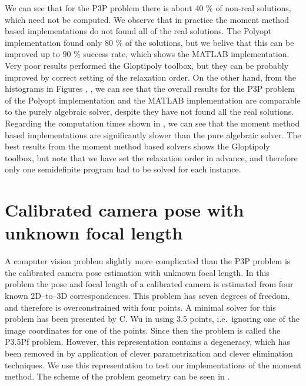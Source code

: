 We can see that for the P3P problem there is about $40$ \% of non-real solutions, which need not be computed.
We observe that in practice the moment method based implementations do not found all of the real solutions.
The Polyopt implementation found only $80$ \% of the solutions, but we belive that this can be improved up to $90$ \% success rate, which shows the MATLAB implementation.
Very poor results performed the Gloptipoly toolbox, but they can be probably improved by correct setting of the relaxation order.
On the other hand, from the histograms in Figures , ,  we can see that the overall results for the P3P problem of the Polyopt implementation and the MATLAB implementation are comparable to the purely algebraic solver, despite they have not found all the real solutions.
Regarding the computation times shown in , we can see that the moment method based implementations are significantly slower than the  pure algebraic solver.
The best results from the moment method based solvers shows the Gloptipoly \cite{gloptipoly} toolbox, but note that we have set the relaxation order in advance, and therefore only one semidefinite program had to be solved for each instance.

\section{Calibrated camera pose with unknown focal length}

A computer vision problem slightly more complicated than the P3P problem is the calibrated camera pose estimation with unknown focal length.
In this problem the pose and focal length of a calibrated camera is estimated from four known 2D--to--3D correspondences.
This problem has seven degrees of freedom, and therefore is overconstrained with four points.
A minimal solver for this problem has been presented by C. Wu in \cite{P35PfWu} using 3.5 points, i.e.\ ignoring one of the image coordinates for one of the points.
Since then the problem is called the P3.5Pf problem.
However, this representation contains a degeneracy, which has been removed in \cite{P35Pf} by application of clever parametrization and clever elimination techniques.
We use this representation to test our implementations of the moment method.
The scheme of the problem geometry can be seen in .

